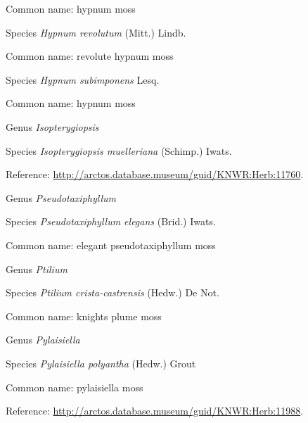\documentclass[9pt, article]{memoir}
\begin{document}
\begin{multicols}{2}
Common name: hypnum moss

\vspace{6pt}\noindent\hspace{36pt}Species \textit{Hypnum revolutum} (Mitt.) Lindb.


Common name: revolute hypnum moss

\vspace{6pt}\noindent\hspace{36pt}Species \textit{Hypnum subimponens} Lesq.


Common name: hypnum moss

\vspace{6pt}\noindent\hspace{30pt}Genus \textit{Isopterygiopsis}


\vspace{6pt}\noindent\hspace{36pt}Species \textit{Isopterygiopsis muelleriana} (Schimp.) Iwats.


Reference: 
\url{http://arctos.database.museum/guid/KNWR:Herb:11760}.

\vspace{6pt}\noindent\hspace{30pt}Genus \textit{Pseudotaxiphyllum}


\vspace{6pt}\noindent\hspace{36pt}Species \textit{Pseudotaxiphyllum elegans} (Brid.) Iwats.


Common name: elegant pseudotaxiphyllum moss

\vspace{6pt}\noindent\hspace{30pt}Genus \textit{Ptilium}


\vspace{6pt}\noindent\hspace{36pt}Species \textit{Ptilium crista-castrensis} (Hedw.) De Not.


Common name: knights plume moss

\vspace{6pt}\noindent\hspace{30pt}Genus \textit{Pylaisiella}


\vspace{6pt}\noindent\hspace{36pt}Species \textit{Pylaisiella polyantha} (Hedw.) Grout


Common name: pylaisiella moss

Reference: 
\url{http://arctos.database.museum/guid/KNWR:Herb:11988}.


\end{multicols}
\end{document}
